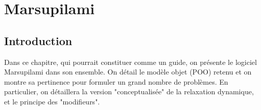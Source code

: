 \chapter{Marsupilami}

\section{Introduction}
Dans ce chapitre, qui pourrait constituer comme un guide, on présente le logiciel Marsupilami dans son ensemble.
On détail le modèle objet (POO) retenu et on montre sa pertinence pour formuler un grand nombre de problèmes.
En particulier, on détaillera la version "conceptualisée" de la relaxation dynamique, et le principe des "modifieurs".

\cite{Dill1992}



